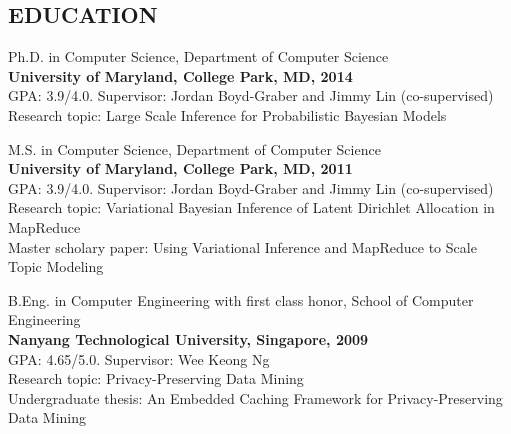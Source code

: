 \documentclass{style/resume}
\begin{document}
 
\thispagestyle{empty} %
\address{
  Tel no.: (240) 460-9082\\
  zhaikedavy@gmail.com\\
  U.S. Permanent Resident
}

\begin{resume}
  \vspace{0.1in}

  \section{EDUCATION}
  \vspace{0.1in}

  Ph.D. in Computer Science, Department of Computer Science\\
  {\bf University of Maryland, College Park, MD, 2014}\\
  GPA: 3.9/4.0. Supervisor: Jordan Boyd-Graber and Jimmy Lin (co-supervised)\\
  Research topic: Large Scale Inference for Probabilistic Bayesian Models

  M.S. in Computer Science, Department of Computer Science\\
  {\bf University of Maryland, College Park, MD, 2011}\\
  GPA: 3.9/4.0. Supervisor: Jordan Boyd-Graber and Jimmy Lin (co-supervised)\\
  Research topic: Variational Bayesian Inference of Latent Dirichlet Allocation in MapReduce\\
  Master scholary paper: Using Variational Inference and MapReduce to Scale Topic Modeling

  B.Eng. in Computer Engineering with first class honor, School of Computer Engineering\\
  {\bf Nanyang Technological University, Singapore, 2009}\\
  GPA: 4.65/5.0. Supervisor: Wee Keong Ng\\
  Research topic: Privacy-Preserving Data Mining\\
  Undergraduate thesis: An Embedded Caching Framework for Privacy-Preserving Data Mining


\end{resume}
\end{document}
